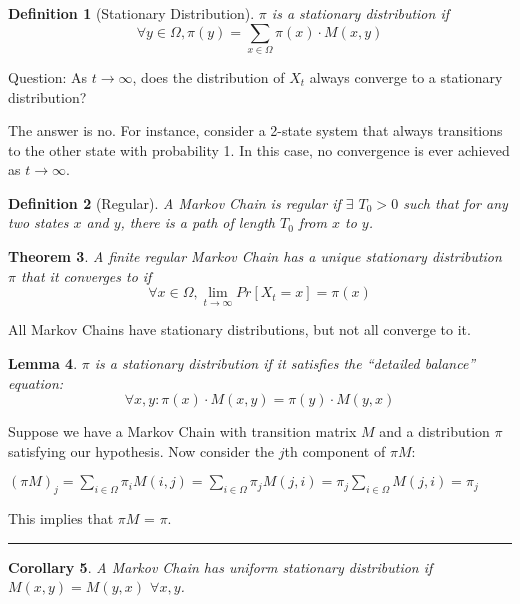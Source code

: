 \documentclass[twoside]{article}
\newcounter{lecnum}
\newtheorem{theorem}{Theorem}[lecnum]
\newtheorem{lemma}[theorem]{Lemma}
\newtheorem{corollary}[theorem]{Corollary}
\newtheorem{definition}[theorem]{Definition}
\newenvironment{proof}{{\bf Proof:}}{\hfill\rule{2mm}{2mm}}
\begin{document}
\begin{definition}[Stationary Distribution]
   $\pi$ is a stationary distribution if
   $$
   \forall y \in \Omega, \pi(y) = \sum_{x \in \Omega} \pi(x) \cdot M(x, y)
   $$
\end{definition}

Question: As $t \rightarrow \infty$, does the distribution of $X_t$ always converge to a stationary distribution?

The answer is no. For instance, consider a 2-state system that always transitions to the other state with probability 1. In this case, no convergence is ever achieved as $t \rightarrow \infty$.

\begin{definition}[Regular]
   A Markov Chain is regular if $\exists$ $T_0 > 0$ such that for any two states $x$ and $y$, there is a path of length $T_0$ from $x$ to $y$.
\end{definition}

\begin{theorem}
   A finite regular Markov Chain has a unique stationary distribution $\pi$ that it converges to if
   $$
   \forall x \in \Omega, \lim_{t \rightarrow \infty} Pr[X_t = x] = \pi(x)
   $$
\end{theorem}

All Markov Chains have stationary distributions, but not all converge to it.

\begin{lemma}
   $\pi$ is a stationary distribution if it satisfies the ``detailed balance'' equation:
   $$
   \forall x,y: \pi(x) \cdot M(x, y) = \pi(y) \cdot M(y, x)
   $$
\end{lemma}

\begin{proof}
Suppose we have a Markov Chain with transition matrix $M$ and a distribution $\pi$ satisfying our hypothesis. Now consider the $j$th component of $\pi M:$

$(\pi M)_j = \sum_{i \in \Omega} \pi_i M(i, j) = \sum_{i \in \Omega} \pi_j M(j, i) = \pi_j \sum_{i \in \Omega}M(j, i) = \pi_j$

This implies that $\pi M$ = $\pi.$

\end{proof}

\begin{corollary}
\label{knapsack}
   A Markov Chain has uniform stationary distribution if $M(x, y) = M(y, x)$ $\forall x, y$.
\end{corollary}
\end{document}
